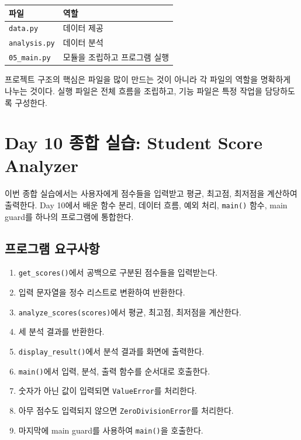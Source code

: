 \documentclass[11pt,a4paper]{article}
\begin{document}
\begin{center}
\begin{tabular}{ll}
\toprule
파일 & 역할 \\
\midrule
\texttt{data.py} & 데이터 제공 \\
\texttt{analysis.py} & 데이터 분석 \\
\texttt{05\_main.py} & 모듈을 조립하고 프로그램 실행 \\
\bottomrule
\end{tabular}
\end{center}

\begin{importantbox}
프로젝트 구조의 핵심은 파일을 많이 만드는 것이 아니라 각 파일의 역할을 명확하게 나누는 것이다. 실행 파일은 전체 흐름을 조립하고, 기능 파일은 특정 작업을 담당하도록 구성한다.
\end{importantbox}

\section{Day 10 종합 실습: Student Score Analyzer}

이번 종합 실습에서는 사용자에게 점수들을 입력받고 평균, 최고점, 최저점을 계산하여 출력한다. Day 10에서 배운 함수 분리, 데이터 흐름, 예외 처리, \texttt{main()} 함수, main guard를 하나의 프로그램에 통합한다.

\subsection{프로그램 요구사항}

\begin{enumerate}[leftmargin=1.8em]
    \item \texttt{get\_scores()}에서 공백으로 구분된 점수들을 입력받는다.
    \item 입력 문자열을 정수 리스트로 변환하여 반환한다.
    \item \texttt{analyze\_scores(scores)}에서 평균, 최고점, 최저점을 계산한다.
    \item 세 분석 결과를 반환한다.
    \item \texttt{display\_result()}에서 분석 결과를 화면에 출력한다.
    \item \texttt{main()}에서 입력, 분석, 출력 함수를 순서대로 호출한다.
    \item 숫자가 아닌 값이 입력되면 \texttt{ValueError}를 처리한다.
    \item 아무 점수도 입력되지 않으면 \texttt{ZeroDivisionError}를 처리한다.
    \item 마지막에 main guard를 사용하여 \texttt{main()}을 호출한다.
\end{enumerate}
\end{document}
